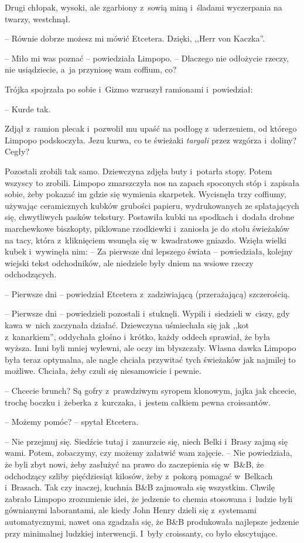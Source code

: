 \documentclass[oneside,polish,11pt,sfheadings]{mwbk}
\begin{document}
Drugi chłopak, wysoki, ale zgarbiony z~sowią miną i~śladami wyczerpania
na twarzy, westchnął. 

-- Równie dobrze możesz mi mówić Etcetera. Dzięki,
,,Herr von Kaczka''.

-- Miło mi was poznać -- powiedziała Limpopo. -- Dlaczego nie odłożycie
rzeczy, nie usiądziecie, a~ja przyniosę wam coffium, co?

Trójka spojrzała po sobie i~Gizmo wzruszył ramionami i~powiedział: 

-- Kurde tak. 

Zdjął z~ramion plecak i~pozwolił mu upaść na podłogę z~uderzeniem, od którego Limpopo podskoczyła. Jezu kurwa, co te świeżaki
\textit{targali} przez wzgórza i~doliny? Cegły?

Pozostali zrobili tak samo. Dziewczyna zdjęła buty i~potarła stopy.
Potem wszyscy to zrobili. Limpopo zmarszczyła nos na zapach spoconych
stóp i~zapisała sobie, żeby pokazać im gdzie się wymienia skarpetek.
Wycisnęła trzy coffiumy, używając ceramicznych kubków grubości papieru,
wydrukowanych ze splatających się, chwytliwych pasków tekstury.
Postawiła kubki na spodkach i~dodała drobne marchewkowe biszkopty,
piklowane rzodkiewki i~zaniosła je do stołu świeżaków na tacy, która z~kliknięciem wsunęła się w~kwadratowe gniazdo. Wzięła wielki kubek i~wywinęła nim: -- Za pierwsze dni lepszego świata -- powiedziała, kolejny
wiejski tekst odchodników, ale niedziele były dniem na wsiowe rzeczy
odchodzących.

-- Pierwsze dni -- powiedział Etcetera z~zadziwiającą (przerażającą)
szczerością.

-- Pierwsze dni -- powiedzieli pozostali i~stuknęli. Wypili i~siedzieli w~ciszy, gdy kawa w~nich zaczynała działać. Dziewczyna uśmiechała się jak
,,kot z~kanarkiem'', oddychała głośno i~krótko, każdy oddech sprawiał,
że była wyższa. Inni byli mniej wylewni, ale oczy im błyszczały. Własna
dawka Limpopo była teraz optymalna, ale nagle chciała przywitać tych
świeżaków jak najmilej to możliwe. Chciała, żeby czuli się niesamowicie
i pewnie.

-- Chcecie brunch? Są gofry z~prawdziwym syropem klonowym, jajka jak
chcecie, trochę boczku i~żeberka z~kurczaka, i~jestem całkiem pewna
croissantów.

-- Możemy pomóc? -- spytał Etcetera.

-- Nie przejmuj się. Siedźcie tutaj i~zanurzcie się, niech Belki i~Brasy
zajmą się wami. Potem, zobaczymy, czy możemy załatwić wam zajęcie. -- Nie
powiedziała, że byli zbyt nowi, żeby zasłużyć na prawo do zaczepienia
się w~B\&B, że odchodzący szliby pięćdziesiąt kilosów, żeby z~pokorą
pomagać w~Belkach i~Brasach. Tak czy inaczej, kuchnia B\&B zajmowała się
wszystkim. Chwilę zabrało Limpopo zrozumienie idei, że jedzenie to
chemia stosowana i~ludzie byli gównianymi laborantami, ale kiedy John
Henry dzieli się z~systemami automatycznymi, nawet ona zgadzała się, że
B\&B produkowała najlepsze jedzenie przy minimalnej ludzkiej
interwencji. I~były croissanty, co było ekscytujące.
\end{document}
